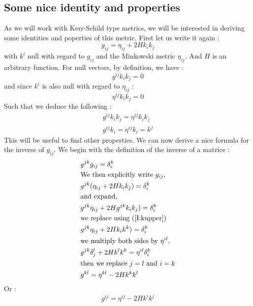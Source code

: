 \documentclass[a4paper,12pt]{article}
\theoremstyle{definition}
\begin{document}
\subsection{Some nice identity and properties}
As we will work with Kerr-Schild type metrics, we will be interested in deriving some identities and poperties of this metric.
First let us write it again :
\begin{equation}
	g_{ij}=\eta_{ij}+2Hk_ik_j
\end{equation}
with $k^i$ null with regard to $g_{ij}$ and the Minkowski metric $\eta_{ij}$.
And $H$ is an arbitrary function.
For null vectors, by definition, we have :
\begin{equation}
	g^{ij}k_ik_j=0
\end{equation}
and since $k^i$ is also null with regard to $\eta_{ij}$ :
\begin{equation}
	\eta^{ij}k_ik_j=0
\end{equation}
Such that we deduce the following :
\begin{align}
	g^{ij}k_ik_j=\eta^{ij}k_ik_j \label{I:kequi}\\
	g^{ij}k_i=\eta^{ij}k_i=k^j \label{I:kupper}
\end{align}
This will be useful to find other properties.
We can now derive a nice formula for the inverse of $g_{ij}$.
We begin with the definition of the inverse of a matrice :
\begin{equation}
\begin{split}
	&g^{jk}g_{ij}=\delta^k_i \\
	&\text{We then explicitly write } g_{ij},\\
	&g^{jk}(\eta_{ij}+2Hk_ik_j)=\delta^k_i\\
	&\text{and expand,}\\
	&g^{jk}\eta_{ij}+2Hg^{jk}k_ik_j)=\delta^k_i\\
	&\text{we replace using (\ref{I:kupper})}\\
	&g^{jk}\eta_{ij}+2Hk_ik^k)=\delta^k_i\\
	&\text{we multiply both sides by }\eta^{il},\\
	&g^{jk}\delta^l_j+2Hk^lk^k=\eta^{il}\delta^k_i\\
	&\text{then we replace $j=l$ and $i=k$}\\
	&g^{kl}=\eta^{kl}-2Hk^kk^l
\end{split}
\end{equation}
Or :
\begin{equation}
	g^{ij}=\eta^{ij}-2Hk^ik^j
\end{equation}
\end{document}
